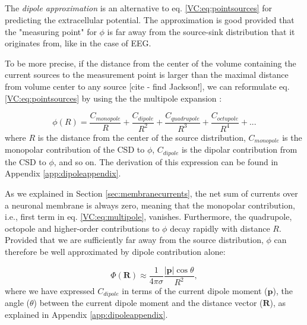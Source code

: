 \subsection{}
\label{sec:dipole}
The \textit{dipole approximation}  is an alternative to eq. \ref{VC:eq:pointsources} for predicting the extracellular potential. The approximation is good provided that the "measuring point" for $\phi$ is far away from the source-sink distribution that it originates from, like in the case of EEG.

To be more precise, if the distance from the center of the volume containing the current sources to the measurement point is larger than the maximal distance from volume center to any source [cite - find Jackson!], we can reformulate eq. \ref{VC:eq:pointsources} by using the the multipole expansion \citep{Nunez2006}:

\begin{equation}
\phi(R) = \frac{C_{monopole}}{R} + \frac{C_{dipole}}{R^2} + \frac{C_{quadrupole}}{R^3} + \frac{C_{octupole}}{R^4} + ...
\label{VC:eq:multipole}
\end{equation}
where $R$ is the distance from the center of the source distribution, $C_{monopole}$ is the monopolar contribution of the CSD to $\phi$, $C_{dipole}$ is the dipolar contribution from the CSD to $\phi$, and so on. The derivation of this expression can be found in Appendix \ref{app:dipoleappendix}. 

As we explained in Section \ref{sec:membranecurrents}, the net sum of currents over a neuronal membrane is always zero, meaning that the monopolar contribution, i.e., first term in eq. \ref{VC:eq:multipole}, vanishes. Furthermore, the quadrupole, octopole and higher-order contributions to $\phi$ decay rapidly with distance $R$. Provided that we are sufficiently far away from the source distribution, $\phi$ can therefore be well approximated by dipole contribution alone:

\begin{equation}\label{VC:eq:CDA}
\Phi(\mathbf{R}) \approx \frac{1}{4 \pi \sigma} \frac{|\mathbf{p}| \cos \theta}{R^2},
\end{equation}
where we have expressed $C_{dipole}$ in terms of the current dipole moment ($\mathbf{p}$), the angle ($\theta$) between the current dipole moment and the distance vector ($\mathbf{R}$), as explained in Appendix \ref{app:dipoleappendix}. 

